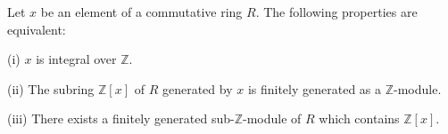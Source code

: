 Let $x$ be an element of a commutative ring $R$. The following properties are equivalent:

(i) $x$ is integral over $\mathbb{Z}$.

(ii) The subring $\mathbb{Z}[x]$ of $R$ generated by $x$ is finitely generated as a $\mathbb{Z}$-module.

(iii) There exists a finitely generated sub-$\mathbb{Z}$-module of $R$ which contains $\mathbb{Z}[x]$.
